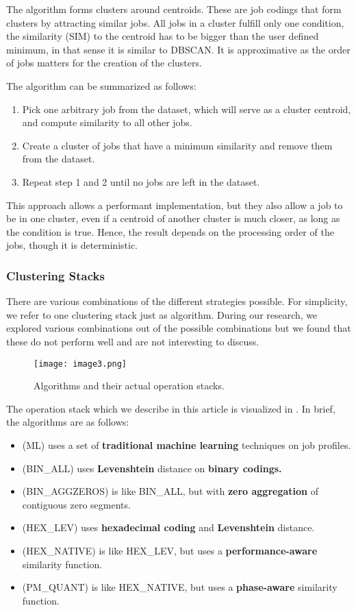 \documentclass{jhps}
\begin{document}
The algorithm forms clusters around centroids.
These are job codings that form clusters by attracting similar jobs.
All jobs in a cluster fulfill only one condition, the similarity (SIM) to the centroid has to be bigger than the user defined minimum, in that sense it is similar to DBSCAN.
It is approximative as the order of jobs matters for the creation of the clusters.

The algorithm can be summarized as follows:
\begin{enumerate}
 \item Pick one arbitrary job from the dataset, which will serve as a cluster centroid, and compute similarity to all other jobs.
 \item Create a cluster of jobs that have a minimum similarity and remove them from the dataset.
 \item Repeat step 1 and 2 until no jobs are left in the dataset.
\end{enumerate}

This approach allows a performant implementation, but they also allow a job to be in one cluster, even if a centroid of another cluster is much closer, as long as the condition is true.
Hence, the result depends on the processing order of the jobs, though it is deterministic.


\subsubsection{Clustering Stacks}
There are various combinations of the different strategies possible.
For simplicity, we refer to one clustering stack just as algorithm.
During our research, we explored various combinations out of the possible combinations but we found that these do not perform well and are not interesting to discuss.

\begin{figure}
  \centering
  \texttt{[image: image3.png]}
  \caption{Algorithms and their actual operation stacks.}
  \label{fig:clustering_stacks}
\end{figure}



The operation stack which we describe in this article is visualized in .
In brief, the algorithms are as follows:
\begin{itemize}
 \item (ML) uses a set of \textbf{traditional machine learning} techniques on job profiles.
 \item (BIN\_ALL) uses \textbf{Levenshtein} distance on \textbf{binary codings.}
 \item (BIN\_AGGZEROS) is like BIN\_ALL, but with \textbf{zero aggregation} of contiguous zero segments.
 \item (HEX\_LEV) uses \textbf{hexadecimal coding} and \textbf{Levenshtein} distance.
 \item (HEX\_NATIVE) is like HEX\_LEV, but uses a \textbf{performance-aware} similarity function.
 \item (PM\_QUANT) is like HEX\_NATIVE, but uses a \textbf{phase-aware} similarity function.
\end{itemize}
\end{document}
